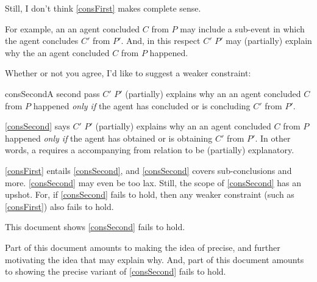 \begin{note}
  Still, I don't think \autoref{consFirst} makes complete sense.

  For example, an  an agent concluded \(C\) from \(P\) may include a sub-event in which the agent concludes \(C'\) from \(P'\).
  And, in this respect \(C'\) \fingfr{} \(P'\) may (partially) explain why the  an agent concluded \(C\) from \(P\) happened.

  Whether or not you agree, I'd like to suggest a weaker constraint:

  \begin{constraint}{consSecond}{A second pass}
    \(C'\) \fingfr{} \(P'\) (partially) explains why an  an agent concluded \(C\) from \(P\) happened \emph{only if} the agent has concluded or is concluding \(C'\) from \(P'\).
  \end{constraint}

  \noindent%
  \autoref{consSecond} says \(C'\) \fingfr{} \(P'\) (partially) explains why an  an agent concluded \(C\) from \(P\) happened \emph{only if} the agent has obtained or is obtaining \(C'\) from \(P'\).
  In other words, a \fingfr{} requires a accompanying from relation to be (partially) explanatory.
\end{note}


\begin{note}
  \autoref{consFirst} entails \autoref{consSecond}, and \autoref{consSecond} covers sub-conclusions and more.
  \autoref{consSecond} may even be too lax.
  Still, the scope of \autoref{consSecond} has an upshot.
  For, if \autoref{consSecond} fails to hold, then any weaker constraint (such as \autoref{consFirst}) also fails to hold.
\end{note}

\begin{note}
  This document shows \autoref{consSecond} fails to hold.

  Part of this document amounts to making the idea of  precise, and further motivating the idea that  may explain why.
  And, part of this document amounts to showing the precise variant of \autoref{consSecond} fails to hold.
\end{note}



